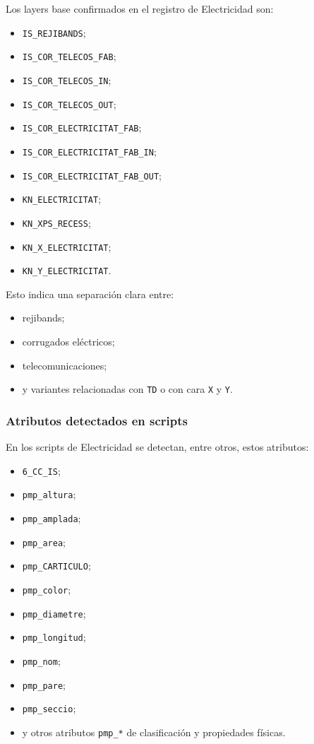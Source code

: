 Los layers base confirmados en el registro de Electricidad son:

\begin{itemize}
\item \texttt{IS\_REJIBANDS};
\item \texttt{IS\_COR\_TELECOS\_FAB};
\item \texttt{IS\_COR\_TELECOS\_IN};
\item \texttt{IS\_COR\_TELECOS\_OUT};
\item \texttt{IS\_COR\_ELECTRICITAT\_FAB};
\item \texttt{IS\_COR\_ELECTRICITAT\_FAB\_IN};
\item \texttt{IS\_COR\_ELECTRICITAT\_FAB\_OUT};
\item \texttt{KN\_ELECTRICITAT};
\item \texttt{KN\_XPS\_RECESS};
\item \texttt{KN\_X\_ELECTRICITAT};
\item \texttt{KN\_Y\_ELECTRICITAT}.
\end{itemize}

Esto indica una separación clara entre:

\begin{itemize}
\item rejibands;
\item corrugados eléctricos;
\item telecomunicaciones;
\item y variantes relacionadas con \texttt{TD} o con cara \texttt{X} y \texttt{Y}.
\end{itemize}


\subsubsection{Atributos detectados en scripts}

En los scripts de Electricidad se detectan, entre otros, estos atributos:

\begin{itemize}
\item \texttt{6\_CC\_IS};
\item \texttt{pmp\_altura};
\item \texttt{pmp\_amplada};
\item \texttt{pmp\_area};
\item \texttt{pmp\_CARTICULO};
\item \texttt{pmp\_color};
\item \texttt{pmp\_diametre};
\item \texttt{pmp\_longitud};
\item \texttt{pmp\_nom};
\item \texttt{pmp\_pare};
\item \texttt{pmp\_seccio};
\item y otros atributos \texttt{pmp\_*} de clasificación y propiedades físicas.
\end{itemize}

